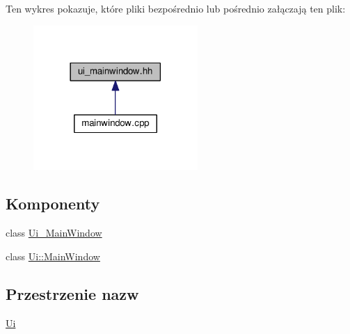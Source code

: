 Ten wykres pokazuje, które pliki bezpośrednio lub pośrednio załączają ten plik\+:\nopagebreak
\begin{figure}[H]
\begin{center}
\leavevmode
\includegraphics[width=177pt]{ui__mainwindow_8hh__dep__incl}
\end{center}
\end{figure}
\subsection*{Komponenty}
\begin{DoxyCompactItemize}
\item 
class \hyperlink{class_ui___main_window}{Ui\+\_\+\+Main\+Window}
\item 
class \hyperlink{class_ui_1_1_main_window}{Ui\+::\+Main\+Window}
\end{DoxyCompactItemize}
\subsection*{Przestrzenie nazw}
\begin{DoxyCompactItemize}
\item 
 \hyperlink{namespace_ui}{Ui}
\end{DoxyCompactItemize}
